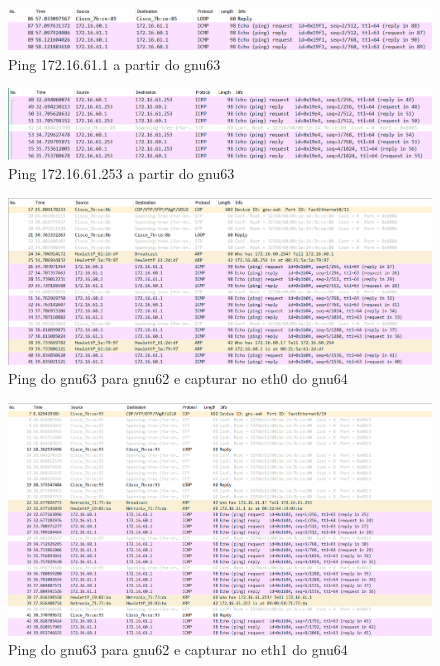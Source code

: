 \documentclass[article, a4paper, 11pt, oneside]{memoir}
\begin{document}
\begin{figure}[h]
	\centering
\includegraphics[scale=0.55]{exp3-step6-ping-61.1-from-gnu63.png}
\caption{Ping 172.16.61.1 a partir do gnu63}
\end{figure}

\begin{figure}[h]
	\centering
\includegraphics[scale=0.55]{exp3-step6-ping-61.253-from-gnu63.png}
\caption{Ping 172.16.61.253 a partir do gnu63}
\end{figure}

\newpage
\begin{figure}[h]
	\centering
\includegraphics[scale=0.55]{exp3-step10-ping-gnu62-from-gnu63-eth0.png}
\caption{Ping do gnu63 para gnu62 e capturar no eth0 do gnu64}
\end{figure}

\begin{figure}[h]
	\centering
\includegraphics[scale=0.55]{exp3-step10-ping-gnu62-from-gnu63-eth1.png}
\caption{Ping do gnu63 para gnu62 e capturar no eth1 do gnu64}
\end{figure}
\end{document}
